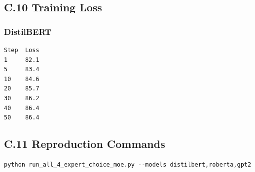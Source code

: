 \subsection{C.10 Training Loss}

\subsubsection{DistilBERT}
\begin{lstlisting}
Step  Loss
1     82.1
5     83.4
10    84.6
20    85.7
30    86.2
40    86.4
50    86.4
\end{lstlisting}

\subsection{C.11 Reproduction Commands}

\begin{lstlisting}
python run_all_4_expert_choice_moe.py --models distilbert,roberta,gpt2
\end{lstlisting}

